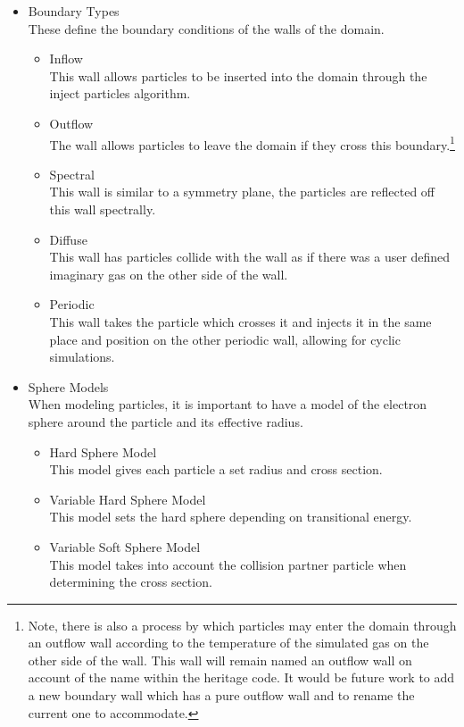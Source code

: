 \begin{itemize}
    \item Boundary Types \\
    These define the boundary conditions of the walls of the domain.
    \begin{itemize}
        \item Inflow \\
        This wall allows particles to be inserted into the domain through the inject particles algorithm.
        \item Outflow \\
        The wall allows particles to leave the domain if they cross this boundary.\footnote{Note, there is also a process by which particles may enter the domain through an outflow wall according to the temperature of the simulated gas on the other side of the wall. This wall will remain named an outflow wall on account of the name within the heritage code. It would be future work to add a new boundary wall which has a pure outflow wall and to rename the current one to accommodate.}
        \item Spectral\\
        This wall is similar to a symmetry plane, the particles are reflected off this wall spectrally.
        \item Diffuse\\
        This wall has particles collide with the wall as if there was a user defined imaginary gas on the other side of the wall.
        \item Periodic \\
        This wall takes the particle which crosses it and injects it in the same place and position on the other periodic wall, allowing for cyclic simulations.
    \end{itemize}
    
    \item Sphere Models\\
    When modeling particles, it is important to have a model of the electron sphere around the particle and its effective radius.
    \begin{itemize}
        \item Hard Sphere Model\\
        This model gives each particle a set radius and cross section.
        \item Variable Hard Sphere Model\\
        This model sets the hard sphere depending on transitional energy.
        \item Variable Soft Sphere Model\\
        This model takes into account the collision partner particle when determining the cross section.
    \end{itemize}
    

\end{itemize}

